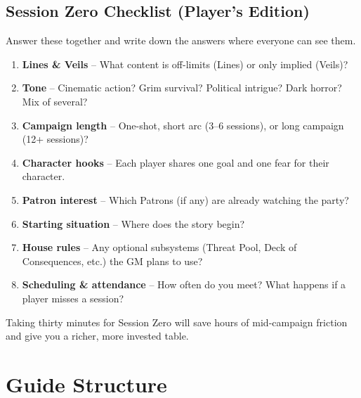 \subsection*{Session Zero Checklist (Player's Edition)}
\begin{tcolorbox}[colback=green!5!white, colframe=green!75!black, title=Session Zero Checklist, fonttitle=\bfseries,breakable]
Answer these together and write down the answers where everyone can see them.
\begin{enumerate}
    \item \textbf{Lines \& Veils} -- What content is off-limits (Lines) or only implied (Veils)?
    \item \textbf{Tone} -- Cinematic action? Grim survival? Political intrigue? Dark horror? Mix of several?
    \item \textbf{Campaign length} -- One-shot, short arc (3--6 sessions), or long campaign (12+ sessions)?
    \item \textbf{Character hooks} -- Each player shares one goal and one fear for their character.
    \item \textbf{Patron interest} -- Which Patrons (if any) are already watching the party?
    \item \textbf{Starting situation} -- Where does the story begin?
    \item \textbf{House rules} -- Any optional subsystems (Threat Pool, Deck of Consequences, etc.) the GM plans to use?
    \item \textbf{Scheduling \& attendance} -- How often do you meet? What happens if a player misses a session?
\end{enumerate}
\end{tcolorbox}

Taking thirty minutes for Session Zero will save hours of mid-campaign friction and give you a richer, more invested table.

\section*{Guide Structure}

